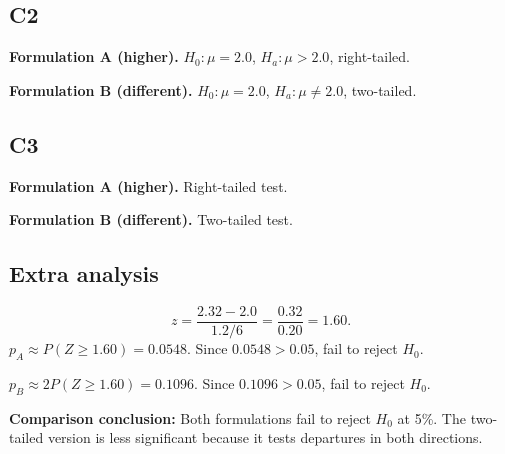 \subsection*{C2}
\textbf{Formulation A (higher).}
\(H_0:\mu=2.0\), \(H_a:\mu>2.0\), right-tailed.

\textbf{Formulation B (different).}
\(H_0:\mu=2.0\), \(H_a:\mu\ne 2.0\), two-tailed.

\subsection*{C3}
\textbf{Formulation A (higher).} Right-tailed test. \RightTailGraph

\textbf{Formulation B (different).} Two-tailed test. \TwoTailGraph

\subsection*{Extra analysis}
\[
z=\frac{2.32-2.0}{1.2/6}=\frac{0.32}{0.20}=1.60.
\]
\(p_A\approx P(Z\ge 1.60)=0.0548\).
Since \(0.0548>0.05\), fail to reject \(H_0\).

\(p_B\approx 2P(Z\ge 1.60)=0.1096\).
Since \(0.1096>0.05\), fail to reject \(H_0\).

\textbf{Comparison conclusion:} Both formulations fail to reject \(H_0\) at 5\%. The two-tailed version is less significant because it tests departures in both directions.


